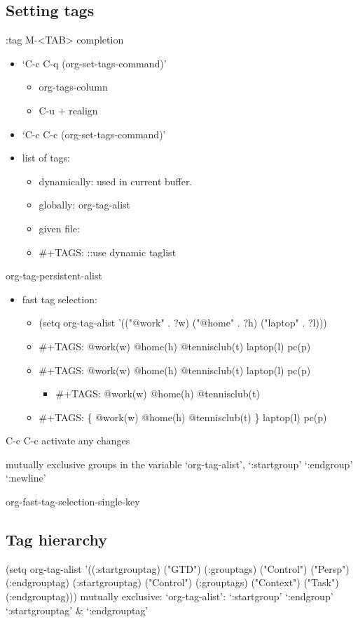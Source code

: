 \documentclass[11pt]{article}
\begin{document}
\subsection{Setting tags}
\label{sec:orgcb2de26}
:tag
M-<TAB> completion
\begin{itemize}
\item ‘C-c C-q     (org-set-tags-command)’
\begin{itemize}
\item org-tags-column
\item C-u +  realign
\end{itemize}
\item ‘C-c C-c     (org-set-tags-command)’

\item list of tags:
\begin{itemize}
\item dynamically: used in current buffer.
\item globally: org-tag-alist
\item given file:
\item \#+TAGS: ::use dynamic taglist
\end{itemize}
\end{itemize}

org-tag-persistent-alist
\begin{itemize}
\item fast tag selection:
\begin{itemize}
\item (setq org-tag-alist '(("@work" . ?w) ("@home" . ?h) ("laptop" . ?l)))
\item \#+TAGS: @work(w)  @home(h)  @tennisclub(t)  laptop(l)  pc(p)
\item \#+TAGS: @work(w)  @home(h)  @tennisclub(t) \n laptop(l)  pc(p)
\begin{itemize}
\item \#+TAGS: @work(w)  @home(h)  @tennisclub(t)
\end{itemize}
\item \#+TAGS: \{ @work(w)  @home(h)  @tennisclub(t) \}  laptop(l)  pc(p)
\end{itemize}
\end{itemize}
C-c C-c activate any changes

mutually exclusive groups in the variable ‘org-tag-alist’,
‘:startgroup’ ‘:endgroup’
‘:newline’

org-fast-tag-selection-single-key
\subsection{Tag hierarchy}
\label{sec:org348e898}
(setq org-tag-alist '((:startgrouptag)
                           ("GTD")
                           (:grouptags)
                           ("Control")
                           ("Persp")
                           (:endgrouptag)
                           (:startgrouptag)
                           ("Control")
                           (:grouptags)
                           ("Context")
                           ("Task")
                           (:endgrouptag)))
mutually exclusive:
‘org-tag-alist’:
‘:startgroup’ ‘:endgroup’
‘:startgrouptag’ \& ‘:endgrouptag’
\end{document}
